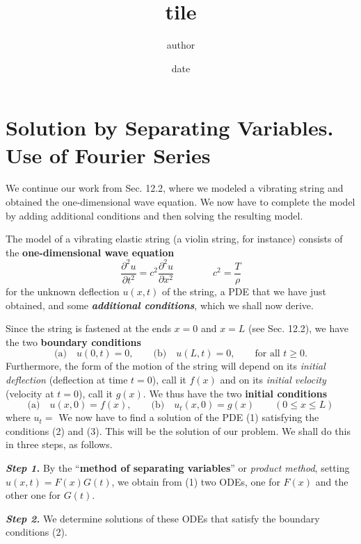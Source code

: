 \documentclass[12pt, leqno, oneside]{amsart}
\title{tile}
\author{author}
\date{date}
\begin{document}
\section{Solution by Separating Variables.\\
Use of Fourier Series}

We continue our work from Sec. 12.2, where we modeled a vibrating string and obtained
the one-dimensional wave equation. We now have to complete the model by adding
additional conditions and then solving the resulting model.

The model of a vibrating elastic string (a violin string, for instance)
consists of the \textbf{one-dimensional wave equation}
\begin{equation}
    \frac{ \partial^2{u} }{ \partial{t^2} } = c^2 \frac{ \partial^2{u} }{
        \partial{x^2} } \qquad \qquad c^2 = \frac{T}{\rho}
\end{equation}
for the unknown deflection $u(x,t)$ of the string, a PDE that we have just obtained, and
some \textbf{\emph{additional conditions}}, which we shall now derive.

Since the string is fastened at the ends $x=0$ and $x=L$ (see Sec. 12.2), we have the
two \textbf{boundary conditions}
\begin{equation}
    \text{(a)} \quad u(0,t) = 0, \qquad \text{(b)} \quad u(L,t) = 0, \qquad \text{for all } t \geq 0.
\end{equation}
Furthermore, the form of the motion of the string will depend on its
\emph{initial deflection}
(deflection at time $t=0$), call it $f(x)$ and on its \emph{initial velocity}
(velocity at $t=0$), call it $g(x)$.
We thus have the two \textbf{initial conditions}
\begin{equation}
    \text{(a)} \quad u(x,0) = f(x), \qquad \text{(b)} \quad u_t(x,0) = g(x) \qquad (0 \leq x \leq L)
\end{equation}
where $u_t=$ %
We now have to find a solution of the PDE (1) satisfying the conditions
(2) and (3). This will be the solution of our problem. We shall do this in three steps, as
follows.

\emph{\textbf{Step 1.}} By the “\textbf{method of separating variables}” or
\emph{product method}, setting $u(x,t)=F(x)G(t)$,
we obtain from (1) two ODEs, one for $F(x)$ and the other one for $G(t)$.

\emph{\textbf{Step 2.}} We determine solutions of these ODEs that satisfy the boundary conditions (2).
\end{document}
